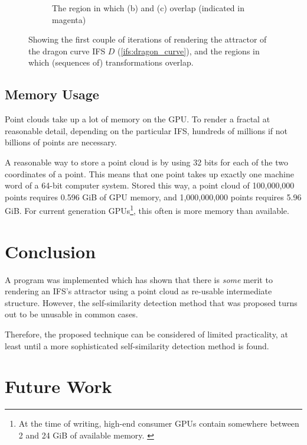 \documentclass[11pt]{article}
\begin{document}
\begin{enumerate}
\begin{figure}
\begin{subfigure}[b]{0.4\textwidth}
         \caption{The region in which (b) and (c) overlap (indicated in magenta)}
         \label{figure:dragon_curve_d}
     \end{subfigure}
        \caption{Showing the first couple of iterations of rendering the attractor of the dragon curve IFS $D$ (\autoref{ifs:dragon_curve}), and the regions in which (sequences of) transformations overlap.}
        \label{figure:dragon_curve_overlaps}
\end{figure}
\end{enumerate}


\subsection{Memory Usage}
\label{sec:org71c655a}

Point clouds take up a lot of memory on the GPU. To render a fractal at reasonable detail, depending on the particular IFS,
hundreds of millions if not billions of points are necessary.

A reasonable way to store a point cloud is by using 32 bits for each of the two coordinates of a point. 
This means that one point takes up exactly one machine word of a 64-bit computer system.
Stored this way, a point cloud of 100,000,000 points requires 0.596 GiB of GPU memory,
and 1,000,000,000 points requires 5.96 GiB.
For current generation GPUs\footnote{At the time of writing, high-end consumer GPUs contain somewhere between 2 and 24 GiB of available memory. \cite{ign2020topgpus}}, this often is more memory than available.

\section{Conclusion}
\label{sec:orgc0b22a6}
\label{section:conclusion}

A program was implemented which has shown that there is \emph{some} merit to rendering an IFS's attractor using a point cloud as re-usable intermediate structure.
However, the self-similarity detection method that was proposed turns out to be unusable in common cases.

Therefore, the proposed technique can be considered of limited practicality, 
at least until a more sophisticated self-similarity detection method is found.

\section{Future Work}
\label{sec:orgf575055}
\label{section:further_work}
\end{document}
